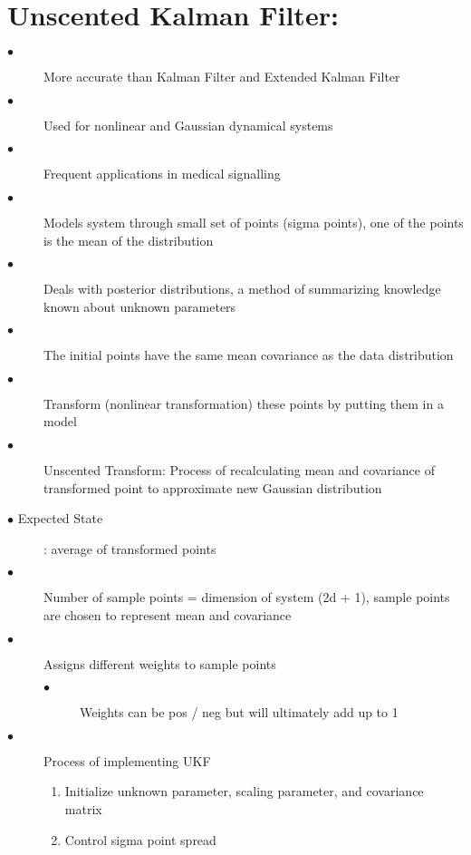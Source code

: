 \documentclass{article}
\begin{document}
\section{Unscented Kalman Filter:}
\begin{description} 
  \item[$\bullet$] More accurate than Kalman Filter and Extended Kalman Filter \cite{inbook, inproceedings}
  \item[$\bullet$] Used for nonlinear and Gaussian dynamical systems \cite{inbook, inproceedings}
  \item[$\bullet$] Frequent applications in medical signalling \cite{inbook}
  \item[$\bullet$] Models system through small set of points (sigma points), one of the points is the mean of the distribution \cite{inbook} 
  \item[$\bullet$] Deals with posterior distributions, a method of summarizing knowledge known about unknown parameters \cite{inbook} 
  \item[$\bullet$] The initial points have the same mean covariance as the data distribution \cite{inproceedings, Wan01theunscented}
  \item[$\bullet$] Transform (nonlinear transformation) these points by putting them in a model \cite{inbook, Wan01theunscented} 
  \item[$\bullet$] Unscented Transform: Process of recalculating mean and covariance of transformed point to approximate new Gaussian distribution \cite{Wan01theunscented, article5}
  \item[$\bullet$ Expected State]: average of transformed points
  \item[$\bullet$] Number of sample points = dimension of system (2d + 1), sample points are chosen to represent mean and covariance \cite{article5}
  \item[$\bullet$] Assigns different weights to sample points \cite{inproceedings3, article5}
  \begin{description}
    \item[$\bullet$] Weights can be pos / neg but will ultimately add up to 1 \cite{article6}
  \end{description}
  \item[$\bullet$] Process of implementing UKF \cite{article4, inbook, article5}
        \begin{enumerate}
            \item Initialize unknown parameter, scaling parameter, and covariance matrix
            \item Control sigma point spread

\end{enumerate}
\end{description}
\end{document}
